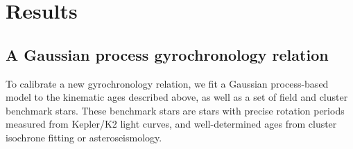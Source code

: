 \section{Results}

\subsection{A Gaussian process gyrochronology relation}
\label{sec:gp_model}

To calibrate a new gyrochronology relation, we fit a Gaussian process-based
model to the kinematic ages described above, as well as a set of field and
cluster benchmark stars.
These benchmark stars are stars with precise rotation periods measured from
Kepler/K2 light curves, and well-determined ages from cluster isochrone
fitting or asteroseismology.

